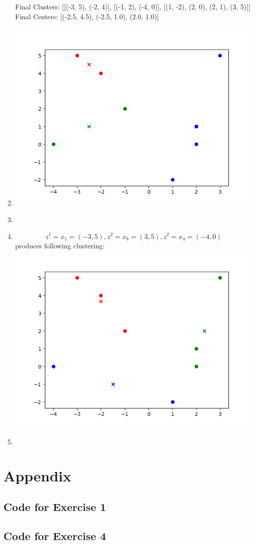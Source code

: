 \documentclass[12pt]{article}
\begin{document}
\begin{enumerate}[label=(\alph*)]
			Final Clusters: [[(-3, 5), (-2, 4)], [(-1, 2), (-4, 0)], [(1, -2), (2, 0), (2, 1), (3, 5)]] \\
			Final Centers: [(-2.5, 4.5), (-2.5, 1.0), (2.0, 1.0)]
	\item	\includegraphics{code/exercise_04_a.png}
	\item
	\item	\[z^1=x_1=(-3,5), z^2=x_8=(3,5), z^2=x_4=(-4,0)\]
			produces following clustering: \\
			\includegraphics{code/exercise_04_d.png}
	\item
\end{enumerate}


\section*{Appendix}\label{appendix}
\subsection*{Code for Exercise 1}

\subsection*{Code for Exercise 4}

\end{document}

